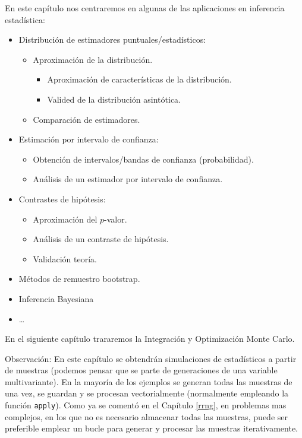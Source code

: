 \documentclass[
]{book}
\theoremstyle{break}
\theoremstyle{definition}
\theoremstyle{definition}
\theoremstyle{definition}
\theoremstyle{remark}
\begin{document}
En este capítulo nos centraremos en
algunas de las aplicaciones en inferencia estadística:

\begin{itemize}
\item
  Distribución de estimadores puntuales/estadísticos:

  \begin{itemize}
  \item
    Aproximación de la distribución.

    \begin{itemize}
    \item
      Aproximación de características de la distribución.
    \item
      Valided de la distribución asintótica.
    \end{itemize}
  \item
    Comparación de estimadores.
  \end{itemize}
\item
  Estimación por intervalo de confianza:

  \begin{itemize}
  \item
    Obtención de intervalos/bandas de confianza (probabilidad).
  \item
    Análisis de un estimador por intervalo de confianza.
  \end{itemize}
\item
  Contrastes de hipótesis:

  \begin{itemize}
  \item
    Aproximación del \(p\)-valor.
  \item
    Análisis de un contraste de hipótesis.
  \item
    Validación teoría.
  \end{itemize}
\item
  Métodos de remuestro bootstrap.
\item
  Inferencia Bayesiana
\item
  \ldots{}
\end{itemize}

En el siguiente capítulo trararemos la Integración y Optimización Monte Carlo.

Observación:
En este capítulo se obtendrán simulaciones de estadísticos a partir de muestras (podemos pensar que se parte de generaciones de una variable multivariante).
En la mayoría de los ejemplos se generan todas las muestras de una vez, se guardan y se procesan vectorialmente (normalmente empleando la función \texttt{apply}).
Como ya se comentó en el Capítulo \ref{rrng}, en problemas mas complejos, en los que no es necesario almacenar todas las muestras, puede ser preferible emplear un bucle para generar y procesar las muestras iterativamente.
\end{document}
